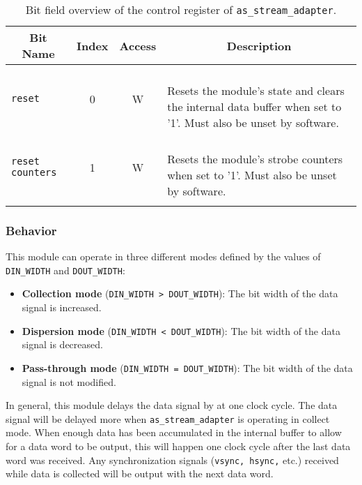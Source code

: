 \begin{longtable}[ht]{|l|c|c|l|}
    \hline
    \multicolumn{1}{|c|}{\textbf{Bit Name}} & \multicolumn{1}{c|}{\textbf{Index}} & \multicolumn{1}{c|}{\textbf{Access}} & \multicolumn{1}{c|}{\textbf{Description}}\\
    \hline
    
    \texttt{reset} & 0 & W & \parbox{9cm}{\ \\
        Resets the module's state and clears the internal data buffer when set to '1'. Must also be unset by software.\vspace{0.3em}
    }\\
    \hline
    
    \texttt{reset counters} & 1 & W & \parbox{9cm}{\ \\
        Resets the module's strobe counters when set to '1'. Must also be unset by software.\vspace{0.3em}
    }\\
    \hline
    
    \caption{Bit field overview of the control register of \texttt{as\_stream\_adapter}.}
\end{longtable}


\subsubsection{Behavior}

This module can operate in three different modes defined by the values of \texttt{DIN\_WIDTH} and \texttt{DOUT\_WIDTH}:

\begin{itemize}
\setlength{\itemsep}{-0.2em}
\item \textbf{Collection mode} (\texttt{DIN\_WIDTH > DOUT\_WIDTH}): The bit width of the data signal is increased.
\item \textbf{Dispersion mode} (\texttt{DIN\_WIDTH < DOUT\_WIDTH}): The bit width of the data signal is decreased.
\item \textbf{Pass-through mode} (\texttt{DIN\_WIDTH = DOUT\_WIDTH}): The bit width of the data signal is not modified.
\end{itemize}

In general, this module delays the data signal by at one clock cycle.
The data signal will be delayed more when \texttt{as\_stream\_adapter} is operating in collect mode.
When enough data has been accumulated in the internal buffer to allow for a data word to be output, this will happen one clock cycle after the last data word was received.
Any synchronization signals (\texttt{vsync, hsync,} etc.) received while data is collected will be output with the next data word.


